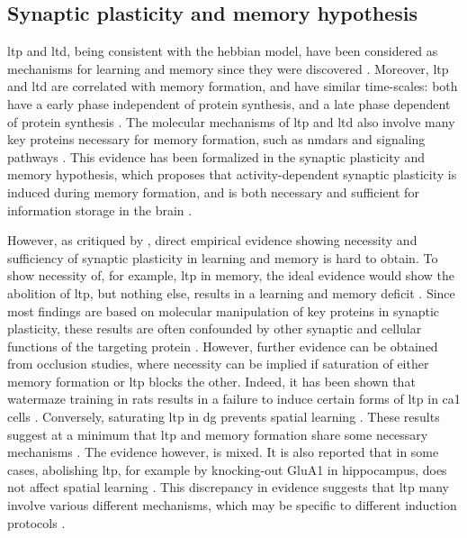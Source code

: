 \subsection{Synaptic plasticity and memory hypothesis}
\Gls{ltp} and \gls{ltd}, being consistent with the hebbian model, have been considered as mechanisms for learning and memory since they were discovered \citep{morris90, bliss93, shors97, martin00}. Moreover, \gls{ltp} and \gls{ltd} are correlated with memory formation, and have similar time-scales: both have a early phase independent of protein synthesis, and a late phase dependent of protein synthesis \citep{abel01, reymann07}. The molecular mechanisms of \gls{ltp} and \gls{ltd} also involve many key proteins necessary for memory formation, such as \glspl{nmdar} and  signaling pathways \citep{martin00}. This evidence has been formalized in the synaptic plasticity and memory hypothesis, which proposes that activity-dependent synaptic plasticity is induced during memory formation, and is both necessary and sufficient for information storage in the brain \citep{martin00}.  

However, as critiqued by \citet{neves08}, direct empirical evidence showing necessity and sufficiency of synaptic plasticity in learning and memory is hard to obtain. To show necessity of, for example, \gls{ltp} in memory, the ideal evidence would show the abolition of \gls{ltp}, but nothing else, results in a learning and memory deficit \citep{neves08}. Since most findings are based on molecular manipulation of key proteins in synaptic plasticity, these results are often confounded by other synaptic and cellular functions of the targeting protein \citep{neves08}. However, further evidence can be obtained from occlusion studies, where necessity can be implied if saturation of either memory formation or \gls{ltp} blocks the other. Indeed, it has been shown that watermaze training in rats results in a failure to induce certain forms of \gls{ltp} in \gls{ca1} cells \citep{habib14}. Conversely, saturating \gls{ltp} in \gls{dg} prevents spatial learning \citep{moser98}. These results suggest at a minimum that \gls{ltp} and memory formation share some necessary mechanisms \citep{takeuchi14}. The evidence however, is mixed. It is also reported that in some cases, abolishing \gls{ltp}, for example by knocking-out GluA1 in hippocampus, does not affect spatial learning \citep{zamanillo99}. This discrepancy in evidence suggests that \gls{ltp} many involve various different mechanisms, which may be specific to different induction protocols \citep{neves08}.

